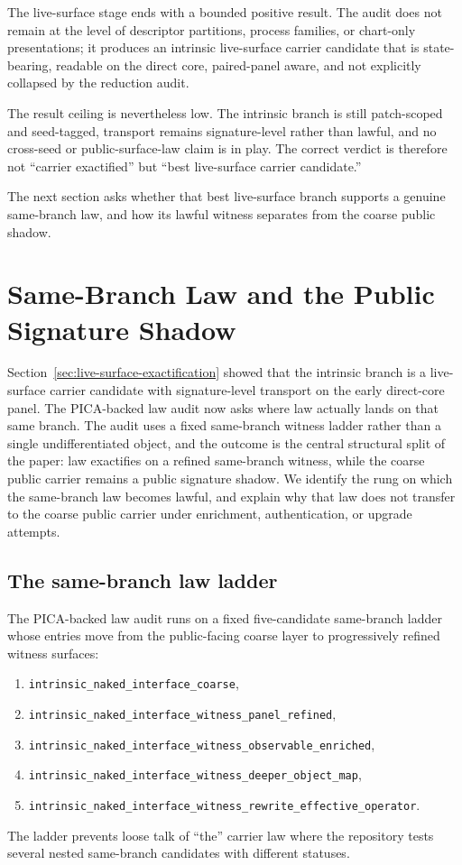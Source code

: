 \documentclass[11pt]{article}
\theoremstyle{definition}
\begin{document}
The live-surface stage ends with a bounded positive result. The audit does not remain
at the level of descriptor partitions, process families, or chart-only presentations;
it produces an intrinsic live-surface carrier candidate that is state-bearing,
readable on the direct core, paired-panel aware, and not explicitly collapsed by the
reduction audit.

The result ceiling is nevertheless low. The intrinsic branch is still patch-scoped and
seed-tagged, transport remains signature-level rather than lawful, and no cross-seed
or public-surface-law claim is in play. The correct verdict is therefore not ``carrier
exactified'' but ``best live-surface carrier candidate.''

The next section asks whether that best live-surface branch supports a genuine
same-branch law, and how its lawful witness separates from the coarse public shadow.
 \section{Same-Branch Law and the Public Signature Shadow}
\label{sec:same-branch-law-and-public-shadow}

Section~\ref{sec:live-surface-exactification} showed that the intrinsic branch is a
live-surface carrier candidate with signature-level transport on the early direct-core
panel. The PICA-backed law audit now asks where law actually lands on that same
branch. The audit uses a fixed same-branch witness ladder rather than a single
undifferentiated object, and the outcome is the central structural split of the paper:
law exactifies on a refined same-branch witness, while the coarse public carrier
remains a public signature shadow. We identify the rung on which the same-branch law
becomes lawful, and explain why that law does not transfer to the coarse public
carrier under enrichment, authentication, or upgrade attempts.

\subsection{The same-branch law ladder}

The PICA-backed law audit runs on a fixed five-candidate same-branch ladder whose
entries move from the public-facing coarse layer to progressively refined witness
surfaces:
\begin{enumerate}[label=\arabic*.,leftmargin=2.0em,itemsep=0.2em]
\item \texttt{intrinsic\_naked\_interface\_coarse},
\item \texttt{intrinsic\_naked\_interface\_witness\_panel\_refined},
\item \texttt{intrinsic\_naked\_interface\_witness\_observable\_enriched},
\item \texttt{intrinsic\_naked\_interface\_witness\_deeper\_object\_map},
\item \texttt{intrinsic\_naked\_interface\_witness\_rewrite\_effective\_operator}.
\end{enumerate}
The ladder prevents loose talk of ``the'' carrier law where the repository tests
several nested same-branch candidates with different statuses.
\end{document}
